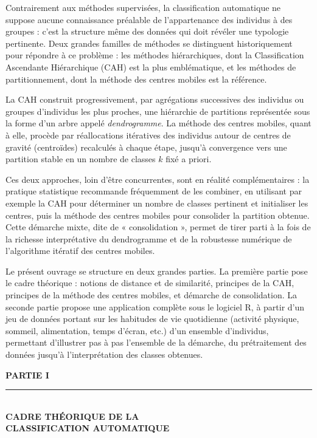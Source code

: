 \documentclass[11pt,a4paper]{report}
\begin{document}
	Contrairement aux méthodes supervisées, la classification automatique ne suppose aucune connaissance préalable de l'appartenance des individus à des groupes : c'est la structure même des données qui doit révéler une typologie pertinente. Deux grandes familles de méthodes se distinguent historiquement pour répondre à ce problème : les méthodes hiérarchiques, dont la Classification Ascendante Hiérarchique (CAH) est la plus emblématique, et les méthodes de partitionnement, dont la méthode des centres mobiles est la référence.
	
	La CAH construit progressivement, par agrégations successives des individus ou groupes d'individus les plus proches, une hiérarchie de partitions représentée sous la forme d'un arbre appelé \emph{dendrogramme}. La méthode des centres mobiles, quant à elle, procède par réallocations itératives des individus autour de centres de gravité (centroïdes) recalculés à chaque étape, jusqu'à convergence vers une partition stable en un nombre de classes $k$ fixé a priori.
	
	Ces deux approches, loin d'être concurrentes, sont en réalité complémentaires : la pratique statistique recommande fréquemment de les combiner, en utilisant par exemple la CAH pour déterminer un nombre de classes pertinent et initialiser les centres, puis la méthode des centres mobiles pour consolider la partition obtenue. Cette démarche mixte, dite de « consolidation », permet de tirer parti à la fois de la richesse interprétative du dendrogramme et de la robustesse numérique de l'algorithme itératif des centres mobiles.
	
	Le présent ouvrage se structure en deux grandes parties. La première partie pose le cadre théorique : notions de distance et de similarité, principes de la CAH, principes de la méthode des centres mobiles, et démarche de consolidation. La seconde partie propose une application complète sous le logiciel R, à partir d'un jeu de données portant sur les habitudes de vie quotidienne (activité physique, sommeil, alimentation, temps d'écran, etc.) d'un ensemble d'individus, permettant d'illustrer pas à pas l'ensemble de la démarche, du prétraitement des données jusqu'à l'interprétation des classes obtenues.
	
	\cleardoublepage
	\thispagestyle{plain}
	\vspace*{4cm}
	\begin{center}
		{\Huge\bfseries\color{navy} PARTIE I}\\[0.6cm]
		{\color{accent}\rule{0.5\textwidth}{1pt}}\\[0.6cm]
		{\Large\bfseries\color{accent} CADRE THÉORIQUE DE LA\\ CLASSIFICATION AUTOMATIQUE}
	\end{center}
	\clearpage
	
\end{document}
